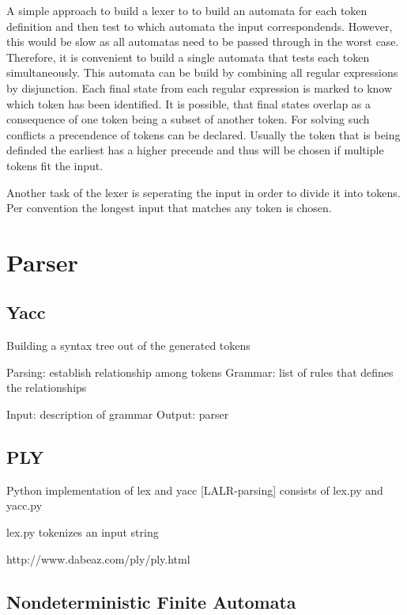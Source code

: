 A simple approach to build a lexer to to build an automata for each token definition and then test to which automata the input correspondends. However, this would be slow as all automatas need to be passed through in the worst case. Therefore, it is convenient to build a single automata that tests each token simultaneously. This automata can be build by combining all regular expressions by disjunction. Each final state from each regular expression is marked to know which token has been identified.
It is possible, that final states overlap as a consequence of one token being a subset of another token. For solving such conflicts a precendence of tokens can be declared. Usually the token that is being definded the earliest has a higher precende and thus will be chosen if multiple tokens fit the input. \cite{Mogensen.2017}

Another task of the lexer is seperating the input in order to divide it into tokens. Per convention the longest input that matches any token is chosen. \cite{Mogensen.2017}






\section{Parser}\label{sec:BackgroundParser}
\subsection{Yacc}\label{sec:BackgroundYacc}

Building a syntax tree out of the generated tokens \cite{Mogensen.2017}

Parsing: establish relationship among tokens \cite{LexYacc.1992}
Grammar: list of rules that defines the relationships \cite{LexYacc.1992}

Input: description of grammar \cite{LexYacc.1992}
Output: parser \cite{LexYacc.1992}


\subsection{PLY}\label{sec:BackgroundPLY}

Python implementation of lex and yacc
[LALR-parsing]
consists of lex.py and yacc.py

lex.py tokenizes an input string

http://www.dabeaz.com/ply/ply.html

\subsection{Nondeterministic Finite Automata}\label{sec:BackgroundNDAutomata}